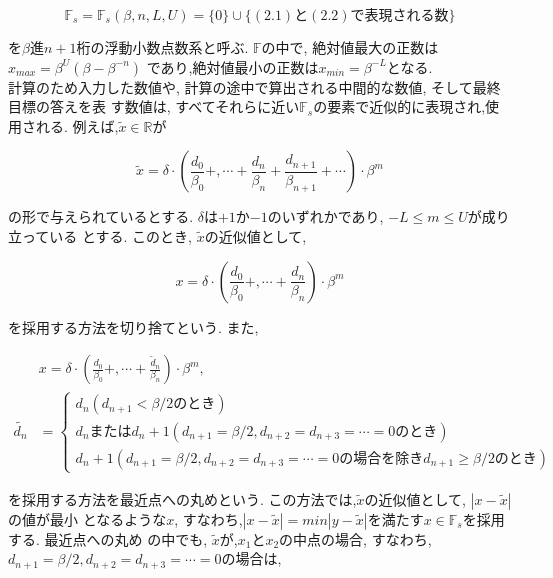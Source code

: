 \documentclass[11pt,a4paper]{jsreport}
\theoremstyle{definition}
\begin{document}
  \begin{equation*}
    \mathbb{F}_s = \mathbb{F}_s(\beta,n,L,U) = \{0\} \cup \{(2.1)と(2.2)で表現される数\}
  \end{equation*}

\noindent を$\beta$進$n + 1$桁の浮動小数点数系と呼ぶ. $\mathbb{F}$の中で, 絶対値最大の正数は$x_{max} = \beta^U(\beta - \beta^{-n})$
であり,絶対値最小の正数は$x_{min} = \beta^{-L}$となる. \\
  計算のため入力した数値や, 計算の途中で算出される中間的な数値, そして最終目標の答えを表
す数値は, すべてそれらに近い$\mathbb{F}_s$の要素で近似的に表現され,使用される. 例えば,$\tilde{x} \in \mathbb{R}$が 

  \begin{equation}
    \tilde{x} = \delta \cdot \left(\frac{d_0}{\beta_0}+, \cdots +\frac{d_n}{\beta_n}+\frac{d_{n+1}}{\beta_{n+1}}+ \cdots \right) \cdot \beta^m
  \end{equation}

\noindent の形で与えられているとする. $\delta$は$+1$か$-1$のいずれかであり, $-L \leq m \leq U$が成り立っている
とする. このとき, $\tilde{x}$の近似値として,

  \begin{equation}
    x = \delta \cdot \left(\frac{d_0}{\beta_0}+, \cdots +\frac{d_n}{\beta_n}\right)\cdot\beta^m
  \end{equation}

\noindent を採用する方法を切り捨てという. また,

  \begin{align}
    & x = \delta\cdot\left(\frac{d_0}{\beta_0}+, \cdots +\frac{\tilde{d}_n}{\beta_n}\right)\cdot\beta^m, \nonumber \\
    \tilde{d_n} &= 
      \begin{cases}
        d_n(d_{n+1} < \beta/\text{2のとき}) \\
        d_n\text{または}d_n+1(d_{n+1} = \beta/2,d_{n+2} = d_{n+3} = \cdots = \text{$0$のとき}) \\
        d_n+1(d_{n+1} = \beta/2,d_{n+2} = d_{n+3} = \cdots = 0\text{の場合を除き}d_{n+1} \geq \beta/\text{2のとき})
      \end{cases}
  \end{align}

\noindent を採用する方法を最近点への丸めという. この方法では,$\tilde{x}$の近似値として, $|x - \tilde{x}|$の値が最小
となるような$x$, すなわち,$|x - \tilde{x}| = min|y - \tilde{x}|$を満たす$x \in \mathbb{F}_s$を採用する. 最近点への丸め
の中でも, $\tilde{x}$が,$x_1$と$x_2$の中点の場合, すなわち,$d_{n+1} = \beta/2,d_{n+2} = d_{n+3} = \cdots = 0$の場合は,
\end{document}

